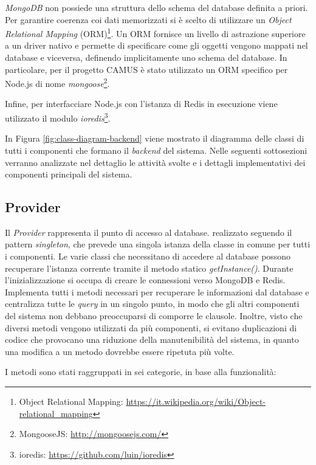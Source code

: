 \emph{MongoDB} non possiede una struttura dello schema del database definita a priori. Per garantire coerenza coi dati memorizzati si è scelto di utilizzare un \emph{Object Relational Mapping} (ORM)\footnote{Object Relational Mapping: \url{https://it.wikipedia.org/wiki/Object-relational_mapping}}. Un ORM fornisce un livello di astrazione superiore a un driver nativo e permette di specificare come gli oggetti vengono mappati nel database e viceversa, definendo implicitamente uno schema del database. In particolare, per il progetto CAMUS è stato utilizzato un ORM specifico per Node.js di nome \emph{mongoose}\footnote{MongooseJS: \url{http://mongoosejs.com/}}.

Infine, per interfacciare Node.js con l'istanza di Redis in esecuzione viene utilizzato il modulo \emph{ioredis}\footnote{ioredis: \url{https://github.com/luin/ioredis}}.

In Figura \ref{fig:class-diagram-backend} viene mostrato il diagramma delle classi di tutti i componenti che formano il \emph{backend} del sistema. Nelle seguenti sottosezioni verranno analizzate nel dettaglio le attività svolte e i dettagli implementativi dei componenti principali del sistema.

\subsection{Provider\label{sec:provider}}

Il \emph{Provider} rappresenta il punto di accesso al database. \upe realizzato seguendo il pattern \emph{singleton}, che prevede una singola istanza della classe in comune per tutti i componenti. Le varie classi che necessitano di accedere al database possono recuperare l'istanza corrente tramite il metodo statico \emph{getInstance()}. Durante l'inizializzazione si occupa di creare le connessioni verso MongoDB e Redis. Implementa tutti i metodi necessari per recuperare le informazioni dal database e centralizza tutte le \emph{query} in un singolo punto, in modo che gli altri componenti del sistema non debbano preoccuparsi di comporre le clausole. Inoltre, visto che diversi metodi vengono utilizzati da più componenti, si evitano duplicazioni di codice che provocano una riduzione della manutenibilità del sistema, in quanto una modifica a un metodo dovrebbe essere ripetuta più volte.

I metodi sono stati raggruppati in sei categorie, in base alla funzionalità:

